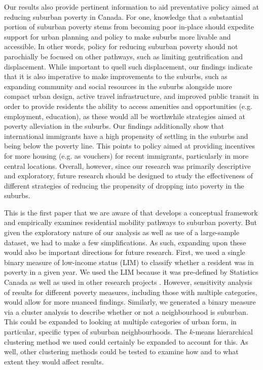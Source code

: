 Our results also provide pertinent information to aid preventative policy aimed at reducing suburban poverty in Canada. For one, knowledge that a substantial portion of suburban poverty stems from becoming poor in-place should expedite support for urban planning and policy to make suburbs more livable and accessible. In other words, policy for reducing suburban poverty should not parochially be focused on other pathways, such as limiting gentrification and displacement. While important to quell such displacement, our findings indicate that it is also imperative to make improvements to the suburbs, such as expanding community and social resources in the suburbs alongside more compact urban design, active travel infrastructure, and improved public transit in order to provide residents the ability to access amenities and opportunities (e.g. employment, education), as these would all be worthwhile strategies aimed at poverty alleviation in the suburbs. Our findings additionally show that international immigrants have a high propensity of settling in the suburbs and being below the poverty line. This points to policy aimed at providing incentives for more housing (e.g. as vouchers) for recent immigrants, particularly in more central locations. Overall, however, since our research was primarily descriptive and exploratory, future research should be designed to study the effectiveness of different strategies of reducing the propensity of dropping into poverty in the suburbs.

This is the first paper that we are aware of that develops a conceptual framework and empirically examines residential mobility pathways to suburban poverty. But given the exploratory nature of our analysis as well as use of a large-sample dataset, we had to make a few simplifications. As such, expanding upon these would also be important directions for future research. First, we used a single binary measure of low-income status (LIM) to classify whether a resident was in poverty in a given year. We used the LIM because it was pre-defined by Statistics Canada as well as used in other research projects \cite{picot_immigration_2014,allen_sizing_2019,brown_money_2019}. However, sensitivity analysis of results for different poverty measures, including those with multiple categories, would allow for more nuanced findings. Similarly, we generated a binary measure via a cluster analysis to describe whether or not a neighbourhood is suburban. This could be expanded to looking at multiple categories of urban form, in particular, specific types of suburban neighbourhoods. The $k$-means hierarchical clustering method we used could certainly be expanded to account for this. As well, other clustering methods could be tested to examine how and to what extent they would affect results.

